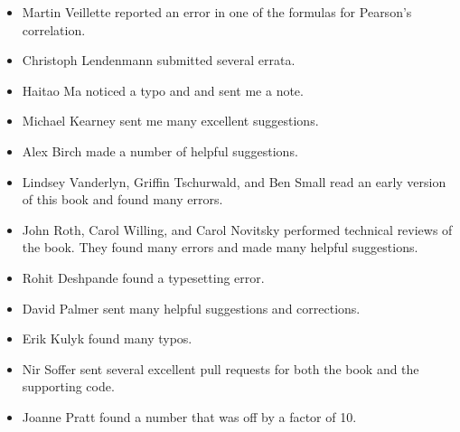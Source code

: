 \begin{itemize}
\item Martin Veillette reported an error in one of the formulas for
Pearson's correlation.

\item Christoph Lendenmann submitted several errata.

\item Haitao Ma noticed a typo and and sent me a note.

\item Michael Kearney sent me many excellent suggestions.

\item Alex Birch made a number of helpful suggestions.

\item Lindsey Vanderlyn, Griffin Tschurwald, and Ben Small read an
  early version of this book and found many errors.

\item John Roth, Carol Willing, and Carol Novitsky performed technical
reviews of the book.  They found many errors and made many
helpful suggestions.

\item Rohit Deshpande found a typesetting error.

\item David Palmer sent many helpful suggestions and corrections.

\item Erik Kulyk found many typos.

\item Nir Soffer sent several excellent pull requests for both the
  book and the supporting code.

\item Joanne Pratt found a number that was off by a factor of 10.


\end{itemize}

\normalsize

\clearemptydoublepage
